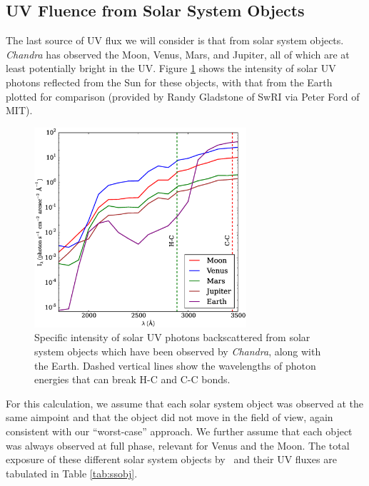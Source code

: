 \documentclass[11pt]{article}
\begin{document}
\subsection{UV Fluence from Solar System Objects}\label{sec:ssobj}

The last source of UV flux we will consider is that from solar system objects. {\it Chandra} has observed the
Moon, Venus, Mars, and Jupiter, all of which are at least potentially bright in the UV. Figure \ref{fig:ss_obj_intensity} shows the intensity of solar UV photons reflected from the Sun for these objects, with that from the Earth plotted for comparison (provided by Randy Gladstone of SwRI via Peter Ford of MIT).

\begin{figure}
\begin{center}
\includegraphics[width=0.7\textwidth]{ss_obj_intensity.eps}
\caption{Specific intensity of solar UV photons backscattered from solar system objects which have been observed by {\it Chandra}, along with the Earth. Dashed vertical lines show the wavelengths of photon energies that can break H-C and C-C bonds.\label{fig:ss_obj_intensity}}
\end{center}
\end{figure}

For this calculation, we assume that each solar system object was observed at the same aimpoint and that the object did not move in the field of view, again consistent with our ``worst-case'' approach. We further assume that each object was always observed at full phase, relevant for Venus and the Moon. The total exposure of these different solar system objects by \chandra~and their UV fluxes are tabulated in Table \ref{tab:ssobj}.
\end{document}
